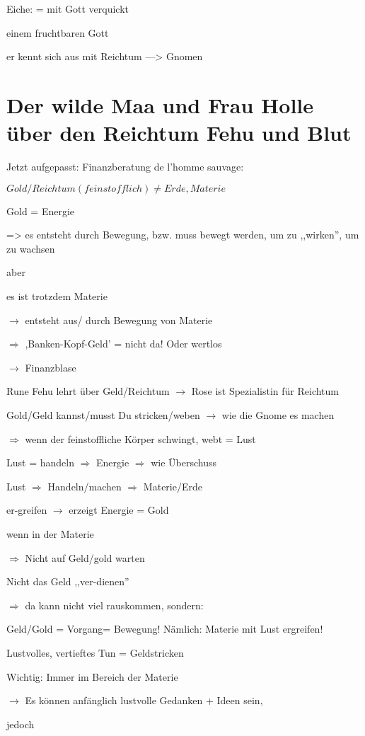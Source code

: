 \documentclass[11pt,titlepage,a5paper]{book}
\begin{document}
Eiche: = mit Gott verquickt

einem fruchtbaren Gott

er kennt sich aus mit Reichtum ---> Gnomen

\section{Der wilde Maa und Frau Holle über den Reichtum Fehu  und Blut}

Jetzt aufgepasst: Finanzberatung de l'homme sauvage:

$Gold/Reichtum( feinstofflich) \neq Erde, Materie$

Gold = Energie

=> es entsteht durch Bewegung, bzw. muss bewegt werden, um zu ,,wirken'', um zu wachsen

aber 

es ist trotzdem Materie

$\to$ entsteht aus/ durch Bewegung von Materie

$\Rightarrow$ ,Banken-Kopf-Geld' = nicht da! Oder wertlos

$\to$ Finanzblase

Rune Fehu  lehrt über Geld/Reichtum
$\to$ Rose ist Spezialistin für Reichtum

Gold/Geld kannst/musst Du stricken/weben 
$\to$ wie die Gnome es machen

$\Rightarrow$ wenn der feinstoffliche Körper schwingt, webt = Lust

Lust = handeln $\Rightarrow$ Energie $\Rightarrow$ wie Überschuss

Lust $\Rightarrow$ Handeln/machen $\Rightarrow$ Materie/Erde

er-greifen  $\to$ erzeigt Energie = Gold

wenn in der Materie

$\Rightarrow$ Nicht auf Geld/gold warten

Nicht das Geld ,,ver-dienen'' 

$\Rightarrow$ da kann nicht viel rauskommen, sondern:

Geld/Gold = Vorgang= Bewegung! Nämlich: Materie mit Lust ergreifen!

Lustvolles, vertieftes Tun = Geldstricken

Wichtig: Immer im Bereich der Materie

$\to$ Es können anfänglich lustvolle Gedanken + Ideen sein,

jedoch
\end{document}
